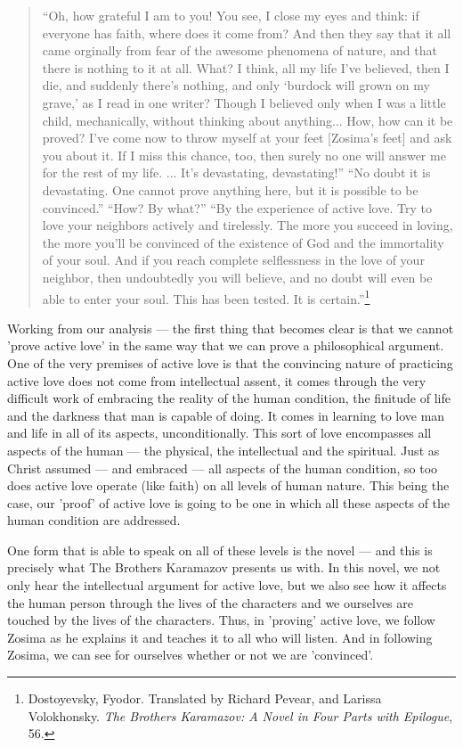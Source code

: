 \begin{quote}
``Oh, how grateful I am to you! You see, I close my eyes and think: if everyone has faith, where does it come from? And then they say that it all came orginally from fear of the awesome phenomena of nature, and that there is nothing to it at all. What? I think, all my life I've believed, then I die, and suddenly there's nothing, and only `burdock will grown on my grave,' as I read in one writer? Though I believed only when I was a little child, mechanically, without thinking about anything... How, how can it be proved? I've come now to throw myself at your feet [Zosima's feet] and ask you about it. If I miss this chance, too, then surely no one will answer me for the rest of my life. ... It's devastating, devastating!''
``No doubt it is devastating. One cannot prove anything here, but it is possible to be convinced.''
``How? By what?''
``By the experience of active love. Try to love your neighbors actively and tirelessly. The more you succeed in loving, the more you'll be convinced of the existence of God and the immortality of your soul. And if you reach complete selflessness in the love of your neighbor, then undoubtedly you will believe, and no doubt will even be able to enter your soul. This has been tested. It is certain.''\footnote{Dostoyevsky, Fyodor. Translated by Richard Pevear, and Larissa Volokhonsky. \emph{The Brothers Karamazov: A Novel in Four Parts with Epilogue}, 56.}
\end{quote}

Working from our analysis --- the first thing that becomes clear is that we cannot 'prove active love' in the same way that we can prove a philosophical argument. One of the very premises of active love is that the convincing nature of practicing active love does not come from intellectual assent, it comes through the very difficult work of embracing the reality of the human condition, the finitude of life and the darkness that man is capable of doing. It comes in learning to love man and life in all of its aspects, unconditionally. This sort of love encompasses all aspects of the human --- the physical, the intellectual and the spiritual. Just as Christ assumed --- and embraced --- all aspects of the human condition, so too does active love operate (like faith) on all levels of human nature. This being the case, our 'proof' of active love is going to be one in which all these aspects of the human condition are addressed. 

One form that is able to speak on all of these levels is the novel --- and this is precisely what The Brothers Karamazov presents us with. In this novel, we not only hear the intellectual argument for active love, but we also see how it affects the human person through the lives of the characters and we ourselves are touched by the lives of the characters. Thus, in 'proving' active love, we follow Zosima as he explains it and teaches it to all who will listen. And in following Zosima, we can see for ourselves whether or not we are 'convinced'.

